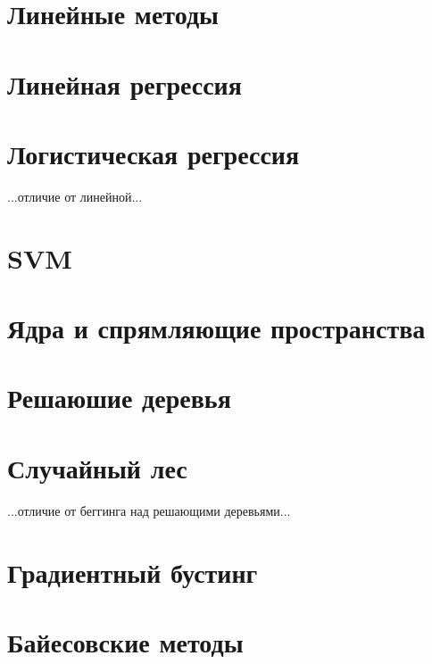 \section{Линейные методы}


\section{Линейная регрессия}


\section{Логистическая регрессия}

...отличие от линейной...


\section{SVM}


\section{Ядра и спрямляющие пространства}


\section{Решаюшие деревья}


\section{Случайный лес}

...отличие от беггинга над решающими деревьями...


\section{Градиентный бустинг}


\section{Байесовские методы}



